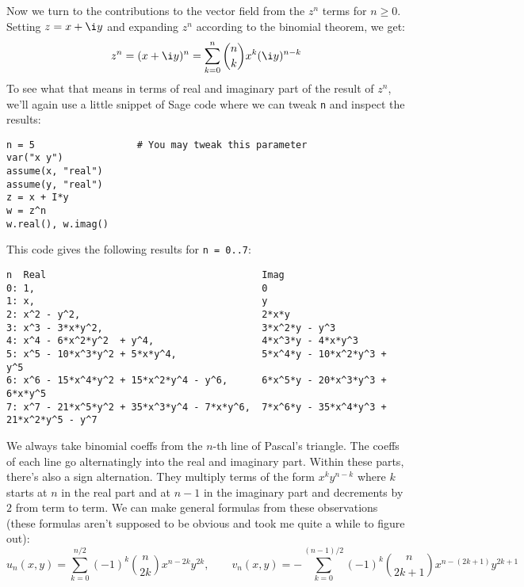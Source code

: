 \documentclass[12pt]{article}
\begin{document}
\medskip 
Now we turn to the contributions to the vector field from the $z^n$ terms for $n \geq 0$. Setting $z = x + \i y$ and expanding $z^n$ according to the binomial theorem, we get:
\begin{equation}
z^n = (x + \i y)^n = \sum_{k=0}^n \binom{n}{k}  x^k (\i y)^{n-k}
\end{equation}
To see what that means in terms of real and imaginary part of the result of $z^n$, we'll again use a little snippet of Sage code where we can tweak \texttt{n} and inspect the results:
\begin{verbatim}
n = 5	               # You may tweak this parameter
var("x y")
assume(x, "real")
assume(y, "real")
z = x + I*y
w = z^n
w.real(), w.imag()
\end{verbatim}
This code gives the following results for \texttt{n = 0..7}:
\begin{verbatim}
n  Real                                      Imag
0: 1,                                        0 
1: x,                                        y
2: x^2 - y^2,                                2*x*y
3: x^3 - 3*x*y^2,                            3*x^2*y - y^3
4: x^4 - 6*x^2*y^2  + y^4,                   4*x^3*y - 4*x*y^3
5: x^5 - 10*x^3*y^2 + 5*x*y^4,               5*x^4*y - 10*x^2*y^3 + y^5
6: x^6 - 15*x^4*y^2 + 15*x^2*y^4 - y^6,      6*x^5*y - 20*x^3*y^3 + 6*x*y^5
7: x^7 - 21*x^5*y^2 + 35*x^3*y^4 - 7*x*y^6,  7*x^6*y - 35*x^4*y^3 + 21*x^2*y^5 - y^7
\end{verbatim}
We always take binomial coeffs from the $n$-th line of Pascal's triangle. The coeffs of each line go alternatingly into the real and imaginary part. Within these parts, there's also a sign alternation. They multiply terms of the form $x^k y^{n-k}$ where $k$ starts at $n$ in the real part and at $n-1$ in the imaginary part and decrements by $2$ from term to term. We can make general formulas from these observations (these formulas aren't supposed to be obvious and took me quite a while to figure out):
\begin{equation}
\label{Eq:PolyaFieldLaurentPowTerm}
\boxed{		
u_n(x,y) = \sum_{k=0}^{n/2} (-1)^k \binom{n}{2 k} x^{n-2k} y^{2k}
,\qquad
v_n(x,y) = -\sum_{k=0}^{(n-1)/2} (-1)^k \binom{n}{2k+1} x^{n-(2k+1)} y^{2k+1}
}
\end{equation}
\end{document}
